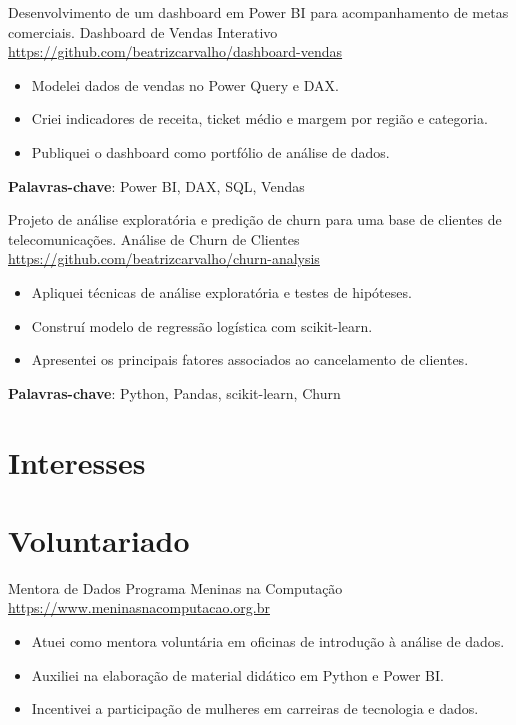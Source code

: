 \documentclass[a4paper, serif, 10pt]{moderncv}
\begin{document}
        {Desenvolvimento de um dashboard em Power BI para acompanhamento de metas comerciais.}
        {Dashboard de Vendas Interativo}
        {\url{https://github.com/beatrizcarvalho/dashboard-vendas}}
        {}
        {\begin{itemize}
\item Modelei dados de vendas no Power Query e DAX.
\item Criei indicadores de receita, ticket médio e margem por região e
categoria.
\item Publiquei o dashboard como portfólio de análise de dados.
\end{itemize}
\textbf{Palavras-chave}: Power BI, DAX, SQL, Vendas}

        {Projeto de análise exploratória e predição de churn para uma base de clientes de telecomunicações.}
        {Análise de Churn de Clientes}
        {\url{https://github.com/beatrizcarvalho/churn-analysis}}
        {}
        {\begin{itemize}
\item Apliquei técnicas de análise exploratória e testes de hipóteses.
\item Construí modelo de regressão logística com scikit-learn.
\item Apresentei os principais fatores associados ao cancelamento de clientes.
\end{itemize}
\textbf{Palavras-chave}: Python, Pandas, scikit-learn, Churn}
\section{Interesses}

\section{Voluntariado}

        {Mentora de Dados}
        {Programa Meninas na Computação}
        {\url{https://www.meninasnacomputacao.org.br}}
        {}
        {\begin{itemize}
\item Atuei como mentora voluntária em oficinas de introdução à análise de
dados.
\item Auxiliei na elaboração de material didático em Python e Power BI.
\item Incentivei a participação de mulheres em carreiras de tecnologia e
dados.
\end{itemize}}
    
\end{document}
